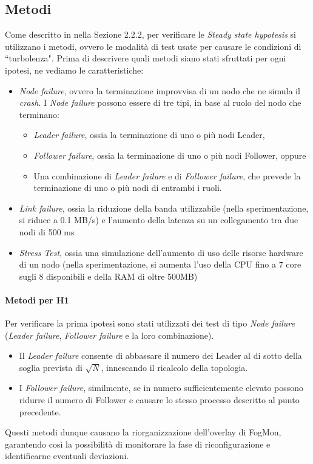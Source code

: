     \subsection{Metodi}
    Come descritto in nella Sezione 2.2.2, per verificare le \textit{Steady state hypotesis} si utilizzano i metodi, ovvero le modalità di test usate per causare le condizioni di ``turbolenza". Prima di descrivere quali metodi siano stati sfruttati per ogni ipotesi, ne vediamo le caratteristiche:
    \begin{itemize}
        \item \textit{Node failure}, ovvero la terminazione improvvisa di un nodo che ne simula il \textit{crash}. I \textit{Node failure} possono essere di tre tipi, in base al ruolo del nodo che terminano:
        \begin{itemize}
            \item \textit{Leader failure}, ossia la terminazione di uno o più nodi Leader,
            \item \textit{Follower failure}, ossia la terminazione di uno o più nodi Follower, oppure
            \item Una combinazione di \textit{Leader failure} e di \textit{Follower failure}, che prevede la terminazione di uno o più nodi di entrambi i ruoli.
        \end{itemize}
        
        \item \textit{Link failure}, ossia la riduzione della banda utilizzabile (nella sperimentazione, si riduce a 0.1 MB/s) e l'aumento della latenza su un collegamento tra due nodi di 500 ms
        
        \item \textit{Stress Test}, ossia una simulazione dell'aumento di uso delle risorse hardware di un nodo (nella sperimentazione, si aumenta l'uso della CPU fino a 7 core sugli 8 disponibili e della RAM di oltre 500MB)
    \end{itemize}
    \paragraph{Metodi per H1}
    
    Per verificare la prima ipotesi sono stati utilizzati dei test di tipo \textit{Node failure} (\textit{Leader failure}, \textit{Follower failure} e la loro combinazione). 
    \begin{itemize}
        \item Il \textit{Leader failure} consente di abbassare il numero dei Leader al di sotto della soglia prevista di $\sqrt{N}$, innescando il ricalcolo della topologia.
        \item I \textit{Follower failure}, similmente, se in numero sufficientemente elevato possono ridurre il numero di Follower e causare lo stesso processo descritto al punto precedente.
    \end{itemize}  Questi metodi dunque causano la riorganizzazione dell'overlay di FogMon, garantendo così la possibilità di monitorare la fase di riconfigurazione e identificarne eventuali deviazioni.
    
